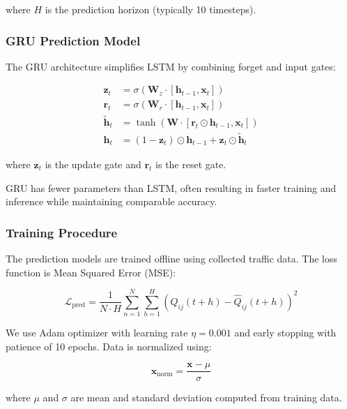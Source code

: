 where $H$ is the prediction horizon (typically 10 timesteps).

\subsubsection{GRU Prediction Model}

The GRU architecture simplifies LSTM by combining forget and input gates:

\begin{equation}
\begin{split}
\mathbf{z}_t &= \sigma(\mathbf{W}_z \cdot [\mathbf{h}_{t-1}, \mathbf{x}_t]) \\
\mathbf{r}_t &= \sigma(\mathbf{W}_r \cdot [\mathbf{h}_{t-1}, \mathbf{x}_t]) \\
\tilde{\mathbf{h}}_t &= \tanh(\mathbf{W} \cdot [\mathbf{r}_t \odot \mathbf{h}_{t-1}, \mathbf{x}_t]) \\
\mathbf{h}_t &= (1 - \mathbf{z}_t) \odot \mathbf{h}_{t-1} + \mathbf{z}_t \odot \tilde{\mathbf{h}}_t
\end{split}
\end{equation}

where $\mathbf{z}_t$ is the update gate and $\mathbf{r}_t$ is the reset gate.

GRU has fewer parameters than LSTM, often resulting in faster training and inference while maintaining comparable accuracy.

\subsubsection{Training Procedure}

The prediction models are trained offline using collected traffic data. The loss function is Mean Squared Error (MSE):

\begin{equation}
\mathcal{L}_{\text{pred}} = \frac{1}{N \cdot H} \sum_{n=1}^{N} \sum_{h=1}^{H} \left(Q_{ij}(t+h) - \hat{Q}_{ij}(t+h)\right)^2
\end{equation}

We use Adam optimizer with learning rate $\eta = 0.001$ and early stopping with patience of 10 epochs. Data is normalized using:

\begin{equation}
\mathbf{x}_{\text{norm}} = \frac{\mathbf{x} - \mu}{\sigma}
\end{equation}

where $\mu$ and $\sigma$ are mean and standard deviation computed from training data.

